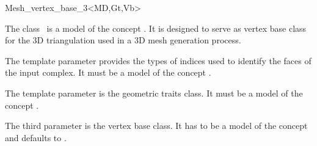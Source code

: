 \ccRefPageBegin


\begin{ccRefClass}{Mesh_vertex_base_3<MD,Gt,Vb>}  %


\ccDefinition
  
The class \ccRefName\ is a model of the concept .
It is designed to serve as vertex base class for the 3D triangulation 
used in a 3D mesh generation process.

\ccParameters

The template parameter   provides  the types of indices
used to identify 
the faces of the input complex. It must be a model
of the concept .

The template parameter  is the geometric traits class.
It  must be a model of the concept .

The third parameter  is the vertex base class. It has to be a model
of the concept  and defaults to
.



\ccIsModel
{}

\ccInheritsFrom
{}

\ccSeeAlso

 \\


\end{ccRefClass}

\ccRefPageEnd

